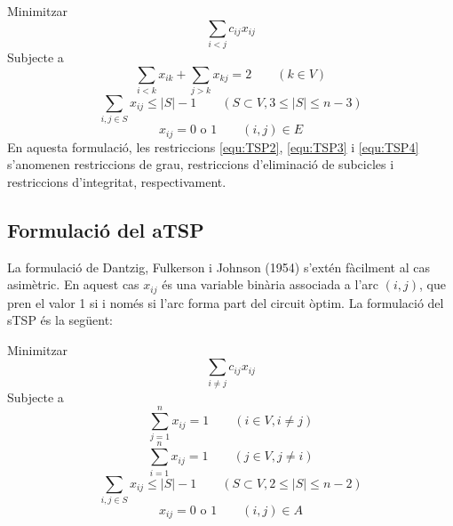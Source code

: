 \documentclass[a4paper,12pt,twoside]{ThesisStyle}
\begin{document}
Minimitzar
\begin{equation}
  \sum_{i<j} c_{ij} x_{ij}
  \label{equ:TSP1}
\end{equation}
Subjecte a
\begin{equation}
  \sum_{i < k} x_{ik} + \sum_{j > k} x_{kj}= 2 \quad\quad \left( k \in V \right)
  \label{equ:TSP2}
\end{equation}
\begin{equation}
  \sum_{i, j \in S} x_{ij} \leq |S| - 1 \quad\quad \left( S \subset V, 3 \leq |S| \leq n-3 \right)
  \label{equ:TSP3}
\end{equation}
\begin{equation}
  x_{ij} = 0 \text{ o } 1 \quad\quad (i,j) \in E
  \label{equ:TSP4}
\end{equation}
En aquesta formulació, les restriccions \eqref{equ:TSP2}, \eqref{equ:TSP3} i \eqref{equ:TSP4} s'anomenen restriccions de grau, restriccions d'eliminació de subcicles i restriccions d'integritat, respectivament.

\subsection{Formulació del aTSP}
\label{FormulacioATSP}
La formulació de Dantzig, Fulkerson i Johnson (1954) s'extén fàcilment al cas asimètric. En aquest cas \(x_{ij}\) és una variable binària associada a l'arc \( (i,j) \), que pren el valor 1 si i només si l'arc forma part del circuit òptim. La formulació del sTSP és la següent:

Minimitzar
\begin{equation}
  \sum_{i \neq j} c_{ij} x_{ij}
  \label{equ:TSP5}
\end{equation}
Subjecte a
\begin{equation}
  \sum_{j=1}^{n} x_{ij} = 1 \quad\quad \left( i \in V, i \neq j \right)
  \label{equ:TSP6}
\end{equation}
\begin{equation}
  \sum_{i=1}^{n} x_{ij} = 1 \quad\quad \left( j \in V, j \neq i \right)
  \label{equ:TSP7}
\end{equation}
\begin{equation}
  \sum_{i, j \in S} x_{ij} \leq |S| - 1 \quad\quad \left( S \subset V, 2 \leq |S| \leq n-2 \right)
  \label{equ:TSP8}
\end{equation}
\begin{equation}
  x_{ij} = 0 \text{ o } 1 \quad\quad (i,j) \in A
  \label{equ:TSP9}
\end{equation}
\end{document}
